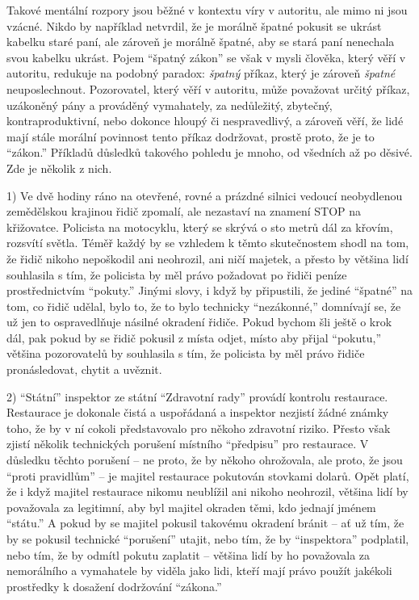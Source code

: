 \documentclass{book}
\begin{document}
Takové mentální rozpory jsou běžné v kontextu víry v autoritu, ale mimo ni jsou vzácné. Nikdo by například netvrdil, že je morálně špatné pokusit se ukrást kabelku staré paní, ale zároveň je morálně špatné, aby se stará paní nenechala svou kabelku ukrást. Pojem \enquote{špatný zákon} se však v mysli člověka, který věří v autoritu, redukuje na podobný paradox: \emph{špatný} příkaz, který je zároveň \emph{špatné} neuposlechnout. Pozorovatel, který věří v autoritu, může považovat určitý příkaz, uzákoněný pány a prováděný vymahately, za nedůležitý, zbytečný, kontraproduktivní, nebo dokonce hloupý či nespravedlivý, a zároveň věří, že lidé mají stále morální povinnost tento příkaz dodržovat, prostě proto, že je to \enquote{zákon.} Příkladů důsledků takového pohledu je mnoho, od všedních až po děsivé. Zde je několik z nich.

1) Ve dvě hodiny ráno na otevřené, rovné a prázdné silnici vedoucí neobydlenou zemědělskou krajinou řidič zpomalí, ale nezastaví na znamení STOP na křižovatce. Policista na motocyklu, který se skrývá o sto metrů dál za křovím, rozsvítí světla. Téměř každý by se vzhledem k těmto skutečnostem shodl na tom, že řidič nikoho nepoškodil ani neohrozil, ani ničí majetek, a přesto by většina lidí souhlasila s tím, že policista by měl právo požadovat po řidiči peníze prostřednictvím \enquote{pokuty.} Jinými slovy, i když by připustili, že jediné \enquote{špatné} na tom, co řidič udělal, bylo to, že to bylo technicky \enquote{nezákonné,} domnívají se, že už jen to ospravedlňuje násilné okradení řidiče. Pokud bychom šli ještě o krok dál, pak pokud by se řidič pokusil z místa odjet, místo aby přijal \enquote{pokutu,} většina pozorovatelů by souhlasila s tím, že policista by měl právo řidiče pronásledovat, chytit a uvěznit.

2) \enquote{Státní} inspektor ze státní \enquote{Zdravotní rady} provádí kontrolu restaurace. Restaurace je dokonale čistá a uspořádaná a inspektor nezjistí žádné známky toho, že by v ní cokoli představovalo pro někoho zdravotní riziko. Přesto však zjistí několik technických porušení místního \enquote{předpisu} pro restaurace. V důsledku těchto porušení -- ne proto, že by někoho ohrožovala, ale proto, že jsou \enquote{proti pravidlům} -- je majitel restaurace pokutován stovkami dolarů. Opět platí, že i když majitel restaurace nikomu neublížil ani nikoho neohrozil, většina lidí by považovala za legitimní, aby byl majitel okraden těmi, kdo jednají jménem \enquote{státu.} A pokud by se majitel pokusil takovému okradení bránit -- ať už tím, že by se pokusil technické \enquote{porušení} utajit, nebo tím, že by \enquote{inspektora} podplatil, nebo tím, že by odmítl pokutu zaplatit -- většina lidí by ho považovala za nemorálního a vymahatele by viděla jako lidi, kteří mají právo použít jakékoli prostředky k dosažení dodržování \enquote{zákona.}
\end{document}
